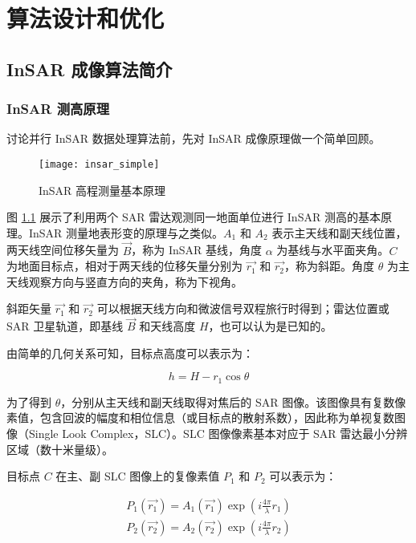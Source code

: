 \chapter{算法设计和优化}

\section{InSAR 成像算法简介}

\subsection{InSAR 测高原理}

讨论并行 InSAR 数据处理算法前，先对 InSAR 成像原理做一个简单回顾。

\begin{figure}[ht]
\centering
\texttt{[image: insar\_simple]}
\caption{InSAR 高程测量基本原理} \label{fig:insar_simple}
\end{figure}

图 \ref{fig:insar_simple} 展示了利用两个 SAR 雷达观测同一地面单位进行 InSAR 测高的基本原理。InSAR 测量地表形变的原理与之类似。$A_1$ 和 $A_2$ 表示主天线和副天线位置，两天线空间位移矢量为 $\vec{B}$，称为 InSAR 基线，角度 $\alpha$ 为基线与水平面夹角。$C$ 为地面目标点，相对于两天线的位移矢量分别为 $\vec{r_1}$ 和 $\vec{r_2}$，称为斜距。角度 $\theta$ 为主天线观察方向与竖直方向的夹角，称为下视角。

斜距矢量 $ \vec{r_1} $ 和 $ \vec{r_2} $ 可以根据天线方向和微波信号双程旅行时得到；雷达位置或 SAR 卫星轨道，即基线 $\vec{B}$ 和天线高度 $H$，也可以认为是已知的。

由简单的几何关系可知，目标点高度可以表示为：

\begin{equation}
    h = H - r_1 \cos\theta
\end{equation}

为了得到 $\theta$，分别从主天线和副天线取得对焦后的 SAR 图像。该图像具有复数像素值，包含回波的幅度和相位信息（或目标点的散射系数），因此称为单视复数图像（Single Look Complex，SLC）。SLC 图像像素基本对应于 SAR 雷达最小分辨区域（数十米量级\cite{sandwell2011gmtsar}）。

目标点 $C$ 在主、副 SLC 图像上的复像素值 $P_1$ 和 $P_2$ 可以表示为：

\begin{equation}
\begin{split}
    P_1(\vec{r_1}) = A_1(\vec{r_1}) \exp(i \frac{4\pi}{\lambda} r_1) \\
    P_2(\vec{r_2}) = A_2(\vec{r_2}) \exp(i \frac{4\pi}{\lambda} r_2) \\
\end{split}
\end{equation}

